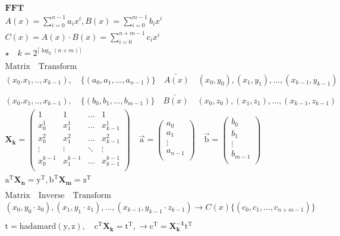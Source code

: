 \documentclass{article}
\begin{document}
\begin{align*}
    \mathbf{FFT} \\ 
    A(x) = \sum_{i=0}^{n-1}a_{i}x^{i}, B(x) = \sum_{i=0}^{m-1}b_{i}x^{i} \\
    C(x) = A(x) \cdot B(x) = \sum_{i=0}^{n+m-1}c_{i}x^{i} \\ 
    \star \quad k = 2^{\lceil\log_{2}(n+m)\rceil}\\
    \\
   \mathrm{Matrix \quad Transform}\\
    (x_{0}.x_{1},..,x_{k-1}), \quad \{(a_{0},a_{1},...,a_{n-1})\} \quad \underrightarrow{A(x)} \quad (x_{0},y_{0}),(x_{1},y_{1}),...,(x_{k-1},y_{k-1}) \\
    \\
    (x_{0}.x_{1},..,x_{k-1}), \quad \{(b_{0},b_{1},...,b_{m-1})\} \quad \underrightarrow{B(x)} \quad (x_{0},z_{0}),(x_{1},z_{1}),...,(x_{k-1},z_{k-1}) \\
    \mathbf{X_{k}} = \left(
        \begin{array}{cccc}
            1 & 1 & ... &1 \\ 
            x_{0}^{1} & x_{1}^{1} & ... & x_{k-1}^{1} \\ 
            x_{0}^{2} & x_{1}^{2} & ... & x_{k-1}^{2}\\  
            \vdots & \vdots & \ddots & \vdots \\ 
            x_{0}^{k-1} & x_{1}^{k-1} & ... & x_{k-1}^{k-1}\\
        \end{array}
    \right) \quad \vec{\mathrm{a}} = \left(
        \begin{array}{c}
            a_{0} \\
            a_{1} \\  
            \vdots \\
            a_{n-1} \\ 
         \end{array}
    \right) \quad \vec{\mathrm{b}} = \left(
        \begin{array}{c}
            b_{0} \\
            b_{1} \\  
            \vdots \\
            b_{m-1} \\ 
         \end{array}
    \right)\\
    \mathrm{a}^{\mathrm{T}} \mathbf{X_{n}} = \mathrm{y}^{\mathrm{T}} ,     \mathrm{b}^{\mathrm{T}} \mathbf{X_{m}} = \mathrm{z}^{\mathrm{T}} \\    
    \\
    \mathrm{Matrix \quad Inverse \quad Transform}\\
    (x_{0},y_{0}\cdot z_{0}),(x_{1},y_{1}\cdot z_{1}),...,(x_{k-1},y_{k-1}\cdot z_{k-1}) \rightarrow C(x)\{(c_{0},c_{1},...,c_{n+m-1})\}\\ 
    \\
    \mathrm{t} = \mathrm{hadamard(y,z)}, \quad \mathrm{c^{\mathrm{T}}}\mathbf{X_{k}} = \mathrm{t^{\mathrm{T}}}, \rightarrow \mathrm{c^{\mathrm{T}}} = \mathbf{X_{k}^{-1}}\mathrm{t^{\mathrm{T}}}\\
\end{align*}
\end{document}
